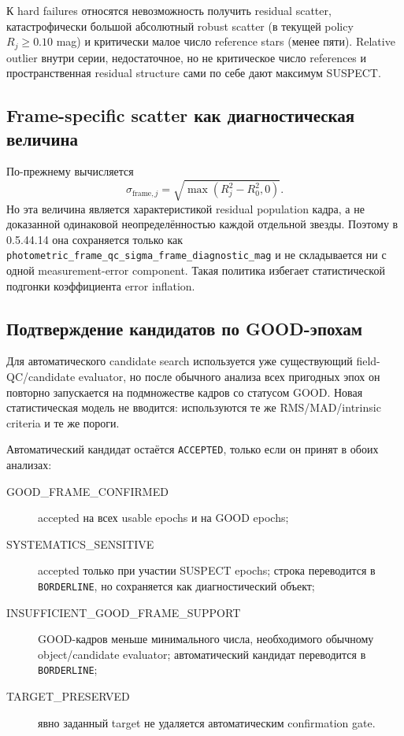 К hard failures относятся невозможность получить residual scatter, катастрофически большой абсолютный
robust scatter (в текущей policy $R_j\ge0.10$ mag) и критически малое число reference stars
(менее пяти). Relative outlier внутри серии, недостаточное, но не критическое число references и
пространственная residual structure сами по себе дают максимум SUSPECT.

\subsection{Frame-specific scatter как диагностическая величина}

По-прежнему вычисляется
\begin{equation}
 \sigma_{\mathrm{frame},j}
 =\sqrt{\max\left(R_j^2-R_0^2,0\right)}.
 \label{eq:frame-qc-uncertainty}
\end{equation}
Но эта величина является характеристикой residual population кадра, а не доказанной одинаковой
неопределённостью каждой отдельной звезды. Поэтому в 0.5.44.14 она сохраняется только как
\texttt{photometric\_frame\_qc\_sigma\_frame\_diagnostic\_mag} и не складывается ни с одной
measurement-error component. Такая политика избегает статистической подгонки коэффициента error inflation.

\subsection{Подтверждение кандидатов по GOOD-эпохам}

Для автоматического candidate search используется уже существующий field-QC/candidate evaluator, но
после обычного анализа всех пригодных эпох он повторно запускается на подмножестве кадров со статусом
GOOD. Новая статистическая модель не вводится: используются те же RMS/MAD/intrinsic criteria и те же
пороги.

Автоматический кандидат остаётся \texttt{ACCEPTED}, только если он принят в обоих анализах:
\begin{description}
  \item[GOOD\_FRAME\_CONFIRMED] accepted на всех usable epochs и на GOOD epochs;
  \item[SYSTEMATICS\_SENSITIVE] accepted только при участии SUSPECT epochs; строка переводится в
  \texttt{BORDERLINE}, но сохраняется как диагностический объект;
  \item[INSUFFICIENT\_GOOD\_FRAME\_SUPPORT] GOOD-кадров меньше минимального числа, необходимого обычному
  object/candidate evaluator; автоматический кандидат переводится в \texttt{BORDERLINE};
  \item[TARGET\_PRESERVED] явно заданный target не удаляется автоматическим confirmation gate.
\end{description}

